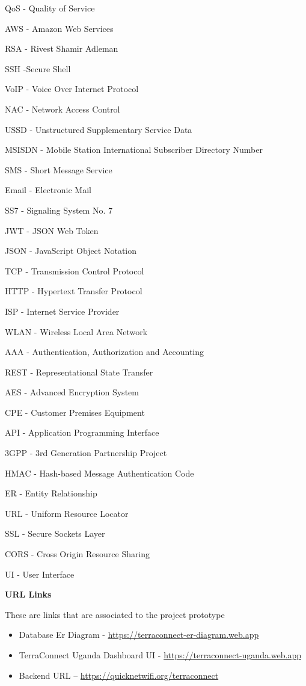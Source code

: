 \documentclass[12pt,a4paper,oneside]{report}
\begin{document}
QoS  - Quality of Service


AWS  - Amazon Web Services


RSA  - Rivest Shamir Adleman


SSH  -Secure Shell


VoIP  - Voice Over Internet Protocol


NAC   - Network Access Control


USSD  - Unstructured Supplementary Service Data


MSISDN - Mobile Station International Subscriber Directory Number


SMS  - Short Message Service


Email  - Electronic Mail


SS7  - Signaling System No. 7


JWT  - JSON Web Token


JSON  - JavaScript Object Notation


TCP  - Transmission Control Protocol


HTTP  - Hypertext Transfer Protocol


ISP  - Internet Service Provider


WLAN  - Wireless Local Area Network


AAA  - Authentication, Authorization and Accounting


REST   - Representational State Transfer


AES  - Advanced Encryption System


CPE  - Customer Premises Equipment


API  - Application Programming Interface


3GPP  - 3rd Generation Partnership Project


HMAC - Hash-based Message Authentication Code


ER  - Entity Relationship


URL  - Uniform Resource Locator


SSL  - Secure Sockets Layer


CORS  - Cross Origin Resource Sharing


UI  - User Interface


\textbf{URL Links}


These are links that are associated to the project prototype


\begin{itemize}
  \item Database Er Diagram - \href{https://terraconnect-er-diagram.web.app}{https://terraconnect-er-diagram.web.app}
  \item TerraConnect Uganda Dashboard UI - \href{https://terraconnect-uganda.web.app}{https://terraconnect-uganda.web.app}
  \item Backend URL -- \href{https://quicknetwifi.org/terraconnect}{https://quicknetwifi.org/terraconnect}
\end{itemize}
\end{document}
